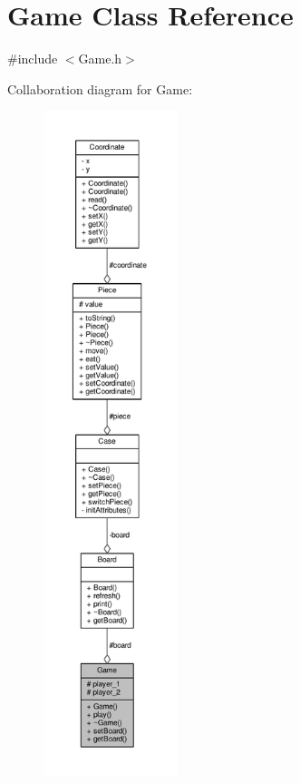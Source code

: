 \hypertarget{class_game}{}\section{Game Class Reference}
\label{class_game}


{\ttfamily \#include $<$Game.\+h$>$}



Collaboration diagram for Game\+:
\nopagebreak
\begin{figure}[H]
\begin{center}
\leavevmode
\includegraphics[height=550pt]{class_game__coll__graph}
\end{center}
\end{figure}
